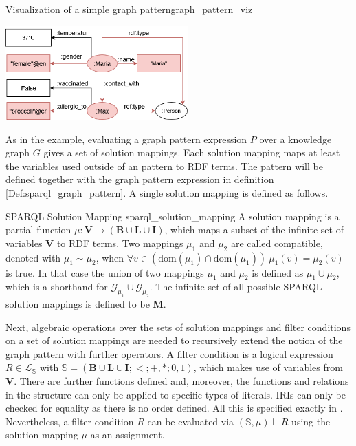 \begin{Bsp}{Visualization of a simple graph pattern}{graph_pattern_viz}
\captionsetup{type=htypei}
    \begin{minipage}[t]{\linewidth}
            \centering
            \vspace{1ex}
            \includegraphics[width=7cm]{images/sparql/graph_pattern_viz_kg.png}
            \label{fig:example_graph_pattern_evaluation}
    \end{minipage}
\end{Bsp}

As in the example, evaluating a graph pattern expression $P$ over a knowledge graph $G$ gives a set of solution mappings. Each solution mapping maps at least the variables used outside of an  pattern to RDF terms. The  pattern will be defined together with the graph pattern expression in definition \ref{Def:sparql_graph_pattern}. A single solution mapping is defined as follows.

\begin{Def}{SPARQL Solution Mapping \cite{prudhommeaux2008sparql}}{sparql_solution_mapping}
A solution mapping is a partial function $\mu: \mathbf{V} \to (\mathbf{B} \cup \mathbf{L} \cup \mathbf{I})$, which maps a subset of the infinite set of variables $\mathbf{V}$ to RDF terms. %
Two mappings $\mu_1$ and $\mu_2$ are called compatible, denoted with $\mu_1 \sim \mu_2$, when $\forall v \in (\text{dom}(\mu_1) \cap \text{dom}(\mu_1)) ~ \mu_1(v) = \mu_2(v)$ is true. In that case the union of two mappings $\mu_1$ and $\mu_2$ is defined as $\mu_1 \cup \mu_2$, which is a shorthand for $\mathcal{G}_{\mu_1} \cup \mathcal{G}_{\mu_2}$.
The infinite set of all possible SPARQL solution mappings is defined to be $\mathbf{M}$.
\end{Def}

Next, algebraic operations over the sets of solution mappings and filter conditions on a set of solution mappings are needed to recursively extend the notion of the graph pattern with further operators.
A filter condition is a logical expression $R \in \mathcal{L_\mathbb{S}}$ with $\mathbb{S} = (\mathbf{B} \cup \mathbf{L} \cup \mathbf{I}; {<}; {+,*};{0,1})$, which makes use of variables from $\mathbf{V}$. There are further functions defined and, moreover, the functions and relations in the structure can only be applied to specific types of literals. IRIs can only be checked for equality as there is no order defined. All this is specified exactly in \cite{prudhommeaux2008sparql}.
Nevertheless, a filter condition $R$ can be evaluated via $(\mathbb{S}, \mu) \models R$ using the solution mapping $\mu$ as an assignment.

